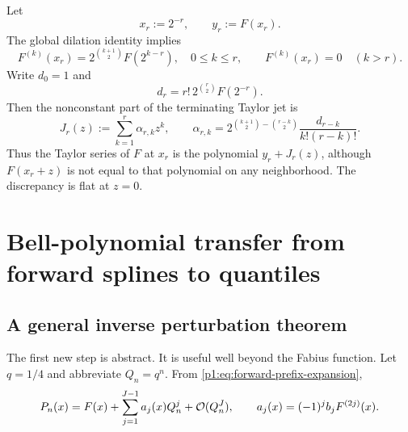 \documentclass[11pt,oneside]{article}
\numberwithin{equation}{section}
\theoremstyle{definition}
\theoremstyle{remark}
\newcommand{\Fn}{P_n}
\begin{document}
Let
\begin{equation}
 x_r:=2^{-r},\qquad y_r:=F(x_r).
 \label{p1:eq:xr-yr}
\end{equation}
The global dilation identity implies
\begin{equation}
 F^{(k)}(x_r)=2^{\binom{k+1}{2}}F(2^{k-r}),
 \quad 0\le k\le r,
 \qquad
 F^{(k)}(x_r)=0\quad(k>r).
 \label{p1:eq:dyadic-jet}
\end{equation}
Write $d_0=1$ and
\begin{equation}
 d_r=r!\,2^{\binom r2}F(2^{-r}).
 \label{p1:eq:d-def}
\end{equation}
Then the nonconstant part of the terminating Taylor jet is
\begin{equation}
 J_r(z):=\sum_{k=1}^{r}\alpha_{r,k}z^k,
 \qquad
 \alpha_{r,k}
 =2^{\binom{k+1}{2}-\binom{r-k}{2}}
 \frac{d_{r-k}}{k!(r-k)!}.
 \label{p1:eq:Jr}
\end{equation}
Thus the Taylor series of $F$ at $x_r$ is the polynomial $y_r+J_r(z)$, although
$F(x_r+z)$ is not equal to that polynomial on any neighborhood.  The discrepancy is flat
at $z=0$.

\section{Bell-polynomial transfer from forward splines to quantiles}
\label{p1:sec:inverse-transfer}

\subsection{A general inverse perturbation theorem}

The first new step is abstract.  It is useful well beyond the Fabius function.
Let $q=1/4$ and abbreviate $Q_n=q^n$.  From \eqref{p1:eq:forward-prefix-expansion},
\begin{equation}
 \Fn(x)=F(x)+\sum_{j=1}^{J-1}a_j(x)Q_n^j+\BigO(Q_n^J),
 \qquad
 a_j(x)=(-1)^jb_jF^{(2j)}(x).
 \label{p1:eq:an-def}
\end{equation}
\end{document}
